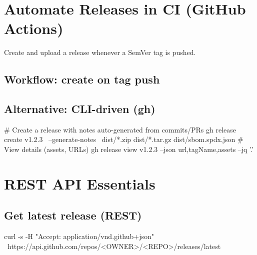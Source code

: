 \documentclass[11pt]{article}
\begin{document}
\section{Automate Releases in CI (GitHub Actions)}
Create and upload a release whenever a SemVer tag is pushed.

\subsection*{Workflow: create on tag push}

\subsection*{Alternative: CLI-driven (gh)}
\begin{bashcode}
# Create a release with notes auto-generated from commits/PRs
gh release create v1.2.3 \
  --generate-notes \
  dist/*.zip dist/*.tar.gz dist/sbom.spdx.json
# View details (assets, URLs)
gh release view v1.2.3 --json url,tagName,assets --jq '.'
\end{bashcode}

\section{REST API Essentials}
\subsection*{Get latest release (REST)}
\begin{bashcode}
curl -s -H "Accept: application/vnd.github+json" \
  https://api.github.com/repos/<OWNER>/<REPO>/releases/latest
\end{bashcode}
\end{document}
